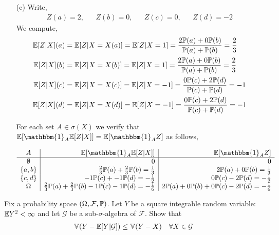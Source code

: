 \documentclass[10pt]{article}
\begin{document}
\begin{solution}[Solution]
\begin{enumerate}
    \item[(c)]  Write,
        \begin{align*}
            Z(a) = 2, && Z(b) = 0, && Z(c) = 0, && Z(d) = -2
        \end{align*}
        We compute,
        \begin{align*}
            \mathbb{E}[Z|X](a) &= \mathbb{E}[Z|X=X(a)] = \mathbb{E}[Z|X=1] = \dfrac{2\mathbb{P}(a)+0\mathbb{P}(b)}{\mathbb{P}(a)+\mathbb{P}(b)} = \dfrac{2}{3} \\
            \mathbb{E}[Z|X](b) &= \mathbb{E}[Z|X=X(b)] = \mathbb{E}[Z|X=1] = \dfrac{2\mathbb{P}(a)+0\mathbb{P}(b)}{\mathbb{P}(a)+\mathbb{P}(b)} = \dfrac{2}{3} \\
            \mathbb{E}[Z|X](c) &= \mathbb{E}[Z|X=X(c)] = \mathbb{E}[Z|X=-1] = \dfrac{0\mathbb{P}(c)+2\mathbb{P}(d)}{\mathbb{P}(c)+\mathbb{P}(d)} = -1 \\
            \mathbb{E}[Z|X](d) &= \mathbb{E}[Z|X=X(d)] = \mathbb{E}[Z|X=-1] = \dfrac{0\mathbb{P}(c)+2\mathbb{P}(d)}{\mathbb{P}(c)+\mathbb{P}(d)} = -1 \\
        \end{align*}
        
        For each set \( A\in\sigma(X) \) we verify that \( \EE[\mathbbm{1}_A\EE[Z|X]]=\EE[\mathbbm{1}_A Z] \) as follows,        
        
        \begin{align*}
        \begin{array}{c|r|r}
             A  &  \EE[\mathbbm{1}_A\EE[Z|X]]  & \EE[\mathbbm{1}_A Z]  \\ \hline   
             \emptyset  & 0 & 0 \\
             \{a,b\}  &  \frac{2}{3}\PP(a)+\frac{2}{3}\PP(b) = \frac{1}{3}  &  2\PP(a)+0\PP(b) = \frac{1}{3}  \\
             \{c,d\}  &  -1\PP(c)+-1\PP(d) = -\frac{1}{2}  &  0\PP(c)-2\PP(d) = -\frac{1}{2}  \\
        \Omega  &  \frac{2}{3}\PP(a)+\frac{2}{3}\PP(b)-1\PP(c)-1\PP(d) = -\frac{1}{6}  &  2\PP(a)+0\PP(b)+0\PP(c)-2\PP(d) = -\frac{1}{6}               \end{array}
        \end{align*}

\end{enumerate}
\end{solution}

\begin{problem}[Exercise 2.2]
    Fix a probability space \( (\Omega,\mathcal{F},\mathbb{P}) \). Let \( Y \) be a square integrable random variable: \( \mathbb{E} Y^2<\infty \) and let \( \mathcal{G} \) be a sub-\( \sigma \)-algebra of \( \mathcal{F} \). Show that
    \begin{align*}
        \mathbb{V}(Y-\mathbb{E}[Y | \mathcal{G}])\leq \mathbb{V}(Y-X) && \forall X\in\mathcal{G}
    \end{align*}
\end{problem}
\end{document}
